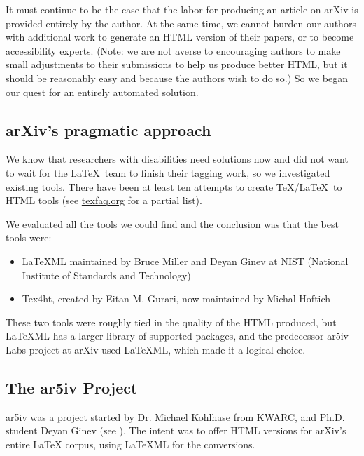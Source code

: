 \documentclass{easychair}
\begin{document}
It must continue to be the case that the labor for producing an article on arXiv is provided entirely by the author. At the same time, we cannot burden our authors with additional work to generate an HTML version of their papers, or to become accessibility experts. (Note: we are not averse to encouraging authors to make small adjustments to their submissions to help us produce better HTML, but it should be reasonably easy and because the authors wish to do so.) So we began our quest for an entirely automated solution. 

\subsection{arXiv’s pragmatic approach}
\label{sect:arXivs pragmatic approach}

We know that researchers with disabilities need solutions now and did not want to wait for the \LaTeX\ team to finish their tagging work, so we investigated existing tools. There have been at least ten attempts to create \TeX/\LaTeX\ to HTML tools (see \href{https://texfaq.org/FAQ-LaTeX2HTML}{texfaq.org} for a partial list).

We evaluated all the tools we could find and the conclusion was that the best tools were:

\begin{itemize}
\item LaTeXML maintained by Bruce Miller and Deyan Ginev at NIST (National Institute of Standards and Technology)
\item Tex4ht, created by Eitan M. Gurari, now maintained by Michal Hoftich
\end{itemize}

These two tools were roughly tied in the quality of the HTML produced, but LaTeXML has a larger library of supported packages, and the predecessor ar5iv Labs project at arXiv used LaTeXML, which made it a logical choice.

\subsection{The ar5iv Project}
\label{sect:The ar5iv project}

\href{https://ar5iv.labs.arxiv.org}{ar5iv} was a project started by Dr. Michael Kohlhase from KWARC, and Ph.D. student Deyan Ginev (see \cite{stamerjohanns2010transforming}). The intent was to offer HTML versions for arXiv’s entire LaTeX corpus, using LaTeXML for the conversions. 
\end{document}

